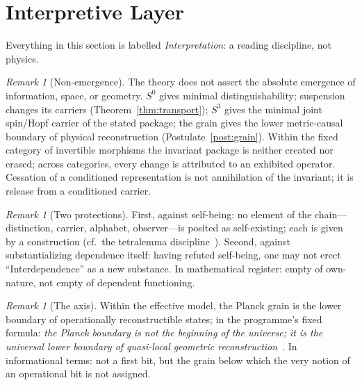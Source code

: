 \documentclass[11pt,a4paper]{article}
\theoremstyle{definition}
\theoremstyle{remark}
\newtheorem{remark}[theorem]{Remark}
\newcommand{\Szero}{S^{0}}
\newcommand{\Sthree}{S^{3}}
\begin{document}
\section{Interpretive Layer}
\label{sec:interpretation}

Everything in this section is labelled \emph{Interpretation}: a reading discipline, not
physics.

\begin{remark}[Non-emergence]
The theory does not assert the absolute emergence of information, space, or geometry.
$\Szero$ gives minimal distinguishability; suspension changes its carriers
(Theorem~\ref{thm:transport}); $\Sthree$ gives the minimal joint spin/Hopf carrier of the
stated package; the grain gives the lower metric-causal boundary of physical reconstruction
(Postulate~\ref{post:grain}).  Within the fixed category of invertible morphisms the invariant
package is neither created nor erased; across categories, every change is attributed to an
exhibited operator.  Cessation of a conditioned representation is not annihilation of the
invariant; it is release from a conditioned carrier.
\end{remark}

\begin{remark}[Two protections]
First, against self-being: no element of the chain---distinction, carrier, alphabet,
observer---is posited as self-existing; each is given by a construction (cf.\ the tetralemma
discipline~\cite{Garfield1995}).  Second, against substantializing dependence itself: having
refuted self-being, one may not erect ``Interdependence'' as a new substance.  In mathematical
register: empty of own-nature, not empty of dependent functioning.
\end{remark}

\begin{remark}[The axis]
Within the effective model, the Planck grain is the lower boundary of operationally
reconstructible states; in the programme's fixed formula: \emph{the Planck boundary is not the
beginning of the universe; it is the universal lower boundary of quasi-local geometric
reconstruction}~\cite{BP2026ricci}.  In informational terms: not a first bit, but the grain
below which the very notion of an operational bit is not assigned.
\end{remark}
\end{document}
